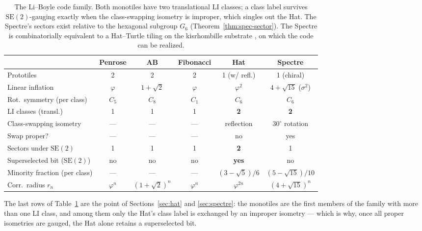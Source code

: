 \documentclass[a4paper,unpublished]{quantumarticle}
\theoremstyle{remark}
\newcommand{\SEtwo}{\mathrm{SE}(2)}
\newcommand{\gphi}{\varphi}
\begin{document}
\begin{table}[t]
\centering
\renewcommand{\arraystretch}{1.20}
\setlength{\tabcolsep}{6pt}
\small
\begin{tabular}{@{}lccccc@{}}
\toprule
                        & Penrose      & AB              & Fibonacci   & Hat                & Spectre \\
\midrule
Prototiles              & 2            & 2               & 2           & 1 (w/ refl.)       & 1 (chiral) \\
Linear inflation        & $\gphi$    & $1+\sqrt{2}$    & $\gphi$   & $\gphi^{2}$      & $4+\sqrt{15}$ ($\sigma^{2}$) \\
Rot.\ symmetry (per class) & $C_{5}$   & $C_{8}$         & $C_{1}$     & $C_{6}$            & $C_{6}$ \\
LI classes (transl.)    & 1            & 1               & 1           & \textbf{2}        & \textbf{2} \\
Class-swapping isometry & ---          & ---             & ---         & reflection         & $30^{\circ}$ rotation \\
Swap proper?            & ---          & ---             & ---         & no                 & yes \\
Sectors under $\SEtwo$ & 1            & 1               & 1           & \textbf{2}        & 1 \\
Superselected bit ($\SEtwo$) & no     & no              & no          & \textbf{yes}      & no \\
Minority fraction (per class) & ---   & ---             & ---         & $(3-\sqrt{5})/6$   & $(5-\sqrt{15})/10$ \\
Corr.\ radius $r_n$    & $\gphi^{n}$& $(1+\sqrt{2})^{n}$& $\gphi^{n}$& $\gphi^{2n}$   & $(4+\sqrt{15})^{n}$ \\
\bottomrule
\end{tabular}
\caption{The Li--Boyle code family. Both monotiles have two
translational LI classes; a class label survives $\SEtwo$-gauging
exactly when the class-swapping isometry is improper, which singles
out the Hat. The Spectre's sectors exist relative to the hexagonal
subgroup $G_{6}$ (Theorem~\ref{thm:spec-sector}). The Spectre is
combinatorially equivalent to a Hat--Turtle tiling on the
kisrhombille substrate \cite[Thm.~3.1]{Smith2024spectre}, on which
the code can be realized.}
\label{tab:compare}
\end{table}

The last rows of Table~\ref{tab:compare} are the point of
Sections~\ref{sec:hat} and \ref{sec:spectre}: the monotiles are the
first members of the family with more than one LI class, and among
them only the Hat's class label is exchanged by an improper isometry
--- which is why, once all proper isometries are gauged, the Hat
alone retains a superselected bit.
\end{document}
